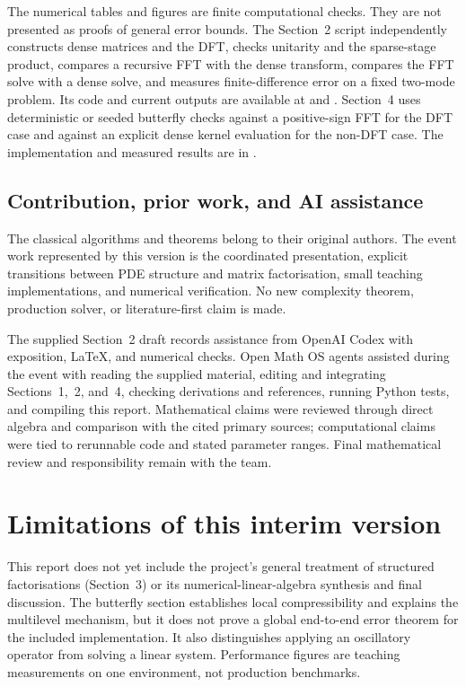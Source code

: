 \documentclass[11pt,a4paper]{article}
\numberwithin{equation}{section}
\begin{document}
The numerical tables and figures are finite computational checks. They are not presented as proofs of general error bounds. The Section~2 script independently constructs dense matrices and the DFT, checks unitarity and the sparse-stage product, compares a recursive FFT with the dense transform, compares the FFT solve with a dense solve, and measures finite-difference error on a fixed two-mode problem. Its code and current outputs are available at  and . Section~4 uses deterministic or seeded butterfly checks against a positive-sign FFT for the DFT case and against an explicit dense kernel evaluation for the non-DFT case. The implementation and measured results are in .

\subsection{Contribution, prior work, and AI assistance}
The classical algorithms and theorems belong to their original authors. The event work represented by this version is the coordinated presentation, explicit transitions between PDE structure and matrix factorisation, small teaching implementations, and numerical verification. No new complexity theorem, production solver, or literature-first claim is made.

The supplied Section~2 draft records assistance from OpenAI Codex with exposition, LaTeX, and numerical checks. Open Math OS agents assisted during the event with reading the supplied material, editing and integrating Sections~1,~2, and~4, checking derivations and references, running Python tests, and compiling this report. Mathematical claims were reviewed through direct algebra and comparison with the cited primary sources; computational claims were tied to rerunnable code and stated parameter ranges. Final mathematical review and responsibility remain with the team.

\section{Limitations of this interim version}
This report does not yet include the project's general treatment of structured factorisations (Section~3) or its numerical-linear-algebra synthesis and final discussion. The butterfly section establishes local compressibility and explains the multilevel mechanism, but it does not prove a global end-to-end error theorem for the included implementation. It also distinguishes applying an oscillatory operator from solving a linear system. Performance figures are teaching measurements on one environment, not production benchmarks.
\end{document}
